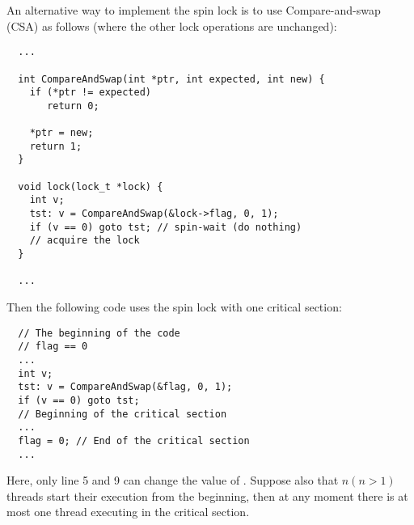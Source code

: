 \documentclass{article}[10pt]
\begin{document}
\begin{mythm}
\label{thm:spin-lock-correct-cas}

An alternative way to implement the spin lock is to use
Compare-and-swap (CSA) as follows (where the other lock operations are
unchanged):
%
\begin{lstlisting}
  ...

  int CompareAndSwap(int *ptr, int expected, int new) {
    if (*ptr != expected)
       return 0;
      
    *ptr = new;
    return 1;
  }

  void lock(lock_t *lock) {
    int v;
    tst: v = CompareAndSwap(&lock->flag, 0, 1);
    if (v == 0) goto tst; // spin-wait (do nothing)
    // acquire the lock
  }

  ...
\end{lstlisting}
%
Then the following code uses the spin lock with one critical section:
%
\begin{lstlisting}
  // The beginning of the code
  // flag == 0
  ...
  int v;
  tst: v = CompareAndSwap(&flag, 0, 1);
  if (v == 0) goto tst;
  // Beginning of the critical section
  ...
  flag = 0; // End of the critical section
  ...
\end{lstlisting}
%
Here, only line 5 and 9 can change the value of \kflag.
%
Suppose also that $n (n > 1)$ threads start their execution from the
beginning, then at any moment there is at most one thread executing in
the critical section.
\end{mythm}
%
\end{document}
